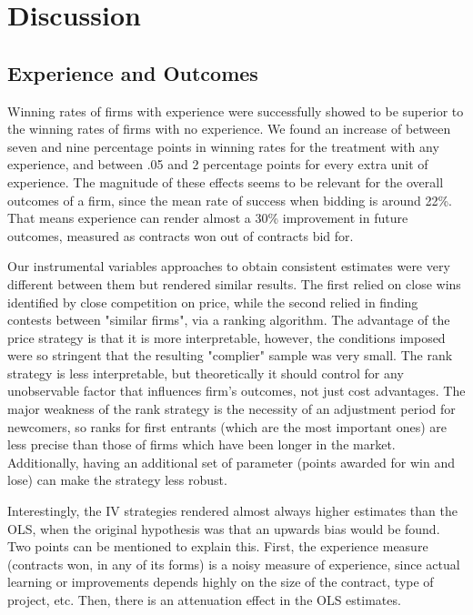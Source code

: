 \chapter{Discussion}

\section{Experience and Outcomes}
Winning rates of firms with experience were successfully showed to be superior to the winning rates  of firms with no experience. We found an increase of between seven and nine percentage points in winning rates for the treatment with any experience, and between .05 and 2 percentage points for every extra unit of experience. The magnitude of these effects seems to be relevant for the overall outcomes of a firm, since the mean rate of success when bidding is around 22\%. That means experience can render almost a 30\% improvement in future outcomes, measured as contracts won out of contracts bid for.

Our instrumental variables approaches to obtain consistent estimates were very different between them but rendered similar results. The first relied on close wins identified by close competition on price, while the second relied in finding contests between "similar firms", via a ranking algorithm. The advantage of the price strategy is that it is more interpretable, however, the conditions imposed were so stringent that the resulting "complier" sample was very small. The rank strategy is less interpretable, but theoretically it should control for any unobservable factor that influences firm's outcomes, not just cost advantages. The major weakness of the rank strategy is the necessity of an adjustment period for newcomers, so ranks for first entrants (which are the most important ones) are less precise than those of firms which have been longer in the market. Additionally, having an additional set of parameter (points awarded for win and lose) can make the strategy less  robust. 

Interestingly, the IV strategies rendered almost always higher estimates than the OLS, when the original hypothesis was that an upwards bias would be found. Two points can be mentioned to explain this. First, the experience measure (contracts won, in any of its forms) is a noisy measure of experience, since actual learning or improvements depends highly on the size of the contract, type of project, etc. Then, there is an attenuation effect in the OLS estimates.

